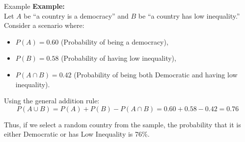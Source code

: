 \documentclass[handout]{beamer} %
\begin{document}
\begin{frame}{Example}
    \textbf{Example:}\\[0.5ex]
    Let \(A\) be “a country is a democracy” and \(B\) be “a country has low inequality.” Consider a scenario where:
    \begin{itemize}
        \item \(P(A) = 0.60\) (Probability of being a democracy),\pause
        \item \(P(B) = 0.58\) (Probability of having low inequality),\pause
        \item \(P(A \cap B) = 0.42\) (Probability of being both Democratic and having low inequality).\pause
    \end{itemize}
    
    Using the general addition rule:
    \[
    P(A \cup B) = P(A) + P(B) - P(A \cap B) = 0.60 + 0.58 - 0.42 = 0.76
    \]
    
    Thus, if we select a random country from the sample, the probability that it is either Democratic or has Low Inequality is 76\%.
\end{frame}
\end{document}
